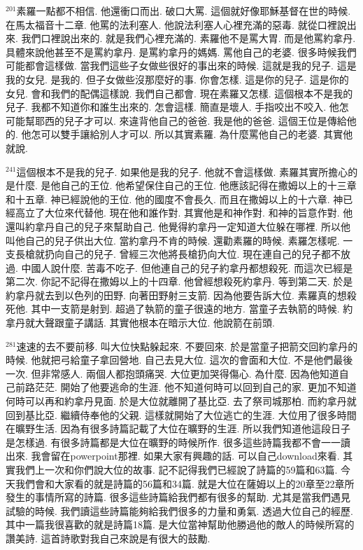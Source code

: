 \documentclass{book}
\begin{document}
$^{201}$素羅一點都不相信.
他還衝口而出.
破口大罵.
這個就好像耶穌基督在世的時候.
在馬太福音十二章.
他罵的法利塞人.
他說法利塞人心裡充滿的惡毒.
就從口裡說出來.
我們口裡說出來的.
就是我們心裡充滿的.
素羅他不是罵大胃.
而是他罵約拿丹.
具體來說他甚至不是罵約拿丹.
是罵約拿丹的媽媽.
罵他自己的老婆.
很多時候我們可能都會這樣做.
當我們這些子女做些很好的事出來的時候.
這就是我的兒子.
這是我的女兒.
是我的.
但子女做些沒那麼好的事.
你會怎樣.
這是你的兒子.
這是你的女兒.
會和我們的配偶這樣說.
我們自己都會.
現在素羅又怎樣.
這個根本不是我的兒子.
我都不知道你和誰生出來的.
怎會這樣.
簡直是壞人.
手指咬出不咬入.
他怎可能幫耶西的兒子才可以.
來違背他自己的爸爸.
我是他的爸爸.
這個王位是傳給他的.
他怎可以雙手讓給別人才可以.
所以其實素羅.
為什麼罵他自己的老婆.
其實他就說.

$^{241}$這個根本不是我的兒子.
如果他是我的兒子.
他就不會這樣做.
素羅其實所擔心的是什麼.
是他自己的王位.
他希望保住自己的王位.
他應該記得在撒姆以上的十三章和十五章.
神已經說他的王位.
他的國度不會長久.
而且在撒姆以上的十六章.
神已經高立了大位來代替他.
現在他和誰作對.
其實他是和神作對.
和神的旨意作對.
他還叫約拿丹自己的兒子來幫助自己.
他覺得約拿丹一定知道大位躲在哪裡.
所以他叫他自己的兒子供出大位.
當約拿丹不肯的時候.
還勸素羅的時候.
素羅怎樣呢.
一支長槍就扔向自己的兒子.
曾經三次他將長槍扔向大位.
現在連自己的兒子都不放過.
中國人說什麼.
苦毒不吃子.
但他連自己的兒子約拿丹都想殺死.
而這次已經是第二次.
你記不記得在撒姆以上的十四章.
他曾經想殺死約拿丹.
等到第二天.
於是約拿丹就去到以色列的田野.
向著田野射三支箭.
因為他要告訴大位.
素羅真的想殺死他.
其中一支箭是射到.
超過了執箭的童子很遠的地方.
當童子去執箭的時候.
約拿丹就大聲跟童子講話.
其實他根本在暗示大位.
他說箭在前頭.

$^{281}$速速的去不要前移.
叫大位快點躲起來.
不要回來.
於是當童子把箭交回約拿丹的時候.
他就把弓給童子拿回營地.
自己去見大位.
這次的會面和大位.
不是他們最後一次.
但非常感人.
兩個人都抱頭痛哭.
大位更加哭得傷心.
為什麼.
因為他知道自己前路茫茫.
開始了他要逃命的生涯.
他不知道何時可以回到自己的家.
更加不知道何時可以再和約拿丹見面.
於是大位就離開了基比亞.
去了祭司城那柏.
而約拿丹就回到基比亞.
繼續侍奉他的父親.
這樣就開始了大位逃亡的生涯.
大位用了很多時間在曠野生活.
因為有很多詩篇記載了大位在曠野的生涯.
所以我們知道他這段日子是怎樣過.
有很多詩篇都是大位在曠野的時候所作.
很多這些詩篇我都不會一一讀出來.
我會留在powerpoint那裡.
如果大家有興趣的話.
可以自己download來看.
其實我們上一次和你們說大位的故事.
記不記得我們已經說了詩篇的59篇和63篇.
今天我們會和大家看的就是詩篇的56篇和34篇.
就是大位在薩姆以上的20章至22章所發生的事情所寫的詩篇.
很多這些詩篇給我們都有很多的幫助.
尤其是當我們遇見試驗的時候.
我們讀這些詩篇能夠給我們很多的力量和勇氣.
透過大位自己的經歷.
其中一篇我很喜歡的就是詩篇18篇.
是大位當神幫助他勝過他的敵人的時候所寫的讚美詩.
這首詩歌對我自己來說是有很大的鼓勵.
\end{document}
